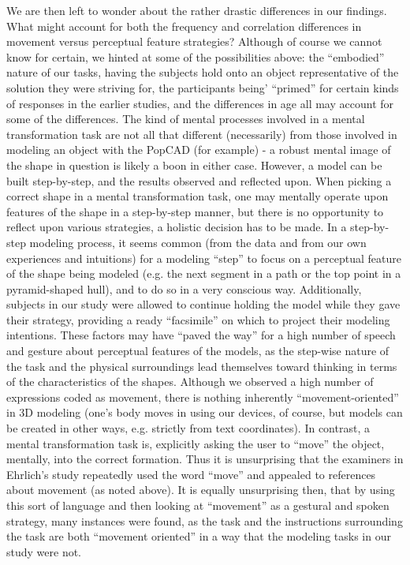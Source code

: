 We are then left to wonder about the rather drastic differences in our findings.
What might account for both the frequency and correlation differences in
movement versus perceptual feature strategies? Although of course we cannot know
for certain, we hinted at some of the possibilities above: the ``embodied''
nature of our tasks, having the subjects hold onto an object representative of
the solution they were striving for, the participants being' ``primed'' for
certain kinds of responses in the earlier studies, and the differences in age
all may account for some of the differences. The kind of mental processes
involved in a mental transformation task are not all that different
(necessarily) from those involved in modeling an object with the PopCAD (for
example) - a robust mental image of the shape in question is likely a boon in
either case. However, a model can be built step-by-step, and the results
observed and reflected upon. When picking a correct shape in a mental
transformation task, one may mentally operate upon features of the shape in a
step-by-step manner, but there is no opportunity to reflect upon various
strategies, a holistic decision has to be made. In a step-by-step modeling
process, it seems common (from the data and from our own experiences and
intuitions) for a modeling ``step'' to focus on a perceptual feature of the
shape being modeled (e.g. the next segment in a path or the top point in a
pyramid-shaped hull), and to do so in a very conscious way. Additionally,
subjects in our study were allowed to continue holding the model while they gave
their strategy, providing a ready ``facsimile'' on which to project their
modeling intentions. These factors may have ``paved the way'' for a high number
of speech and gesture about perceptual features of the models, as the step-wise
nature of the task and the physical surroundings lead themselves toward thinking
in terms of the characteristics of the shapes. Although we observed a high
number of expressions coded as movement, there is nothing inherently
``movement-oriented'' in 3D modeling (one's body moves in using our devices, of
course, but models can be created in other ways, e.g. strictly from text
coordinates). In contrast, a mental transformation task is, explicitly asking
the user to ``move'' the object, mentally, into the correct formation. Thus it
is unsurprising that the examiners in Ehrlich's study repeatedly used the word
``move'' and appealed to references about movement (as noted above). It is
equally unsurprising then, that by using this sort of language and then looking
at ``movement'' as a gestural and spoken strategy, many instances were found, as
the task and the instructions surrounding the task are both ``movement
oriented'' in a way that the modeling tasks in our study were not. 

